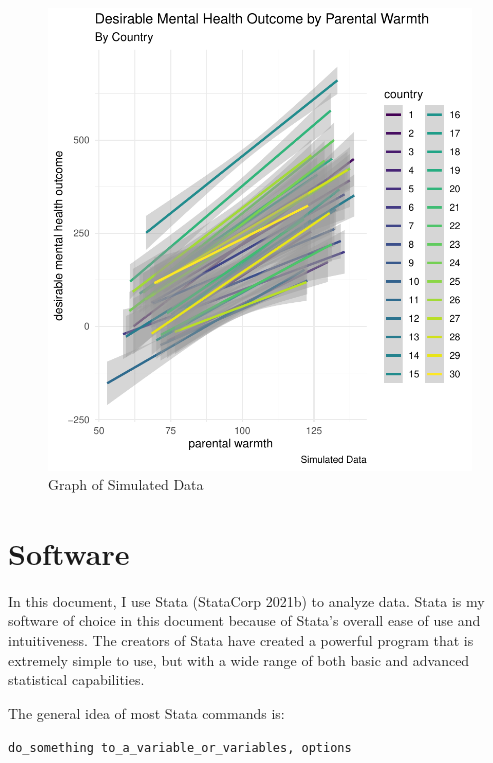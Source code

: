 \documentclass[
  letterpaper,
  DIV=11,
  numbers=noendperiod]{scrreprt}
\begin{document}
\begin{figure}

{\centering \includegraphics{./simulated-multi-country-data_files/figure-pdf/fig-data-1.pdf}

}

\caption{\label{fig-data}Graph of Simulated Data}

\end{figure}


\hypertarget{sec-software}{%
\chapter{Software}\label{sec-software}}

In this document, I use Stata (StataCorp 2021b) to analyze data. Stata
is my software of choice in this document because of Stata's overall
ease of use and intuitiveness. The creators of Stata have created a
powerful program that is extremely simple to use, but with a wide range
of both basic and advanced statistical capabilities.

The general idea of most Stata commands is:

\texttt{do\_something\ to\_a\_variable\_or\_variables,\ options}
\end{document}
